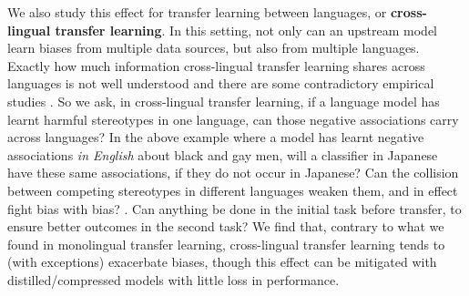 We also study this effect for transfer learning between languages, or \textbf{cross-lingual transfer learning}. In this setting, not only can an upstream model learn biases from multiple data sources, but also from multiple languages. Exactly how much information cross-lingual transfer learning shares across languages is not well understood and there are some contradictory empirical studies \citep{}. So we ask, in cross-lingual transfer learning, if a language model has learnt harmful stereotypes in one language, can those negative associations carry across languages? In the above example where a model has learnt negative associations \textit{in English} about black and gay men, will a classifier in Japanese have these same associations, if they do not occur in Japanese? Can the collision between competing stereotypes in different languages weaken them, and in effect fight bias with bias? \citep{stanovsky-etal-2019-evaluating}. Can anything be done in the initial task before transfer, to ensure better outcomes in the second task? We find that, contrary to what we found in monolingual transfer learning, cross-lingual transfer learning tends to (with exceptions) exacerbate biases, though this effect can be mitigated with distilled/compressed models with little loss in performance. 

